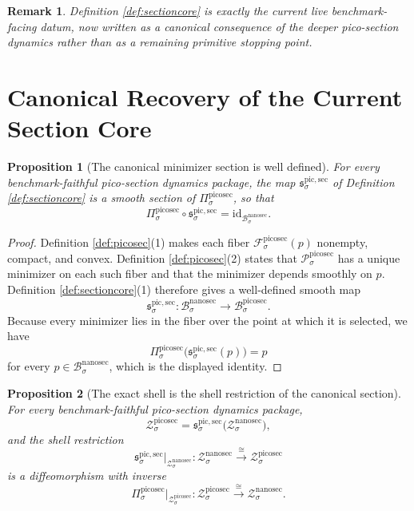 \documentclass[11pt]{article}
\newcommand{\NanoSectionBody}[1]{\mathcal B_{#1}^{\mathrm{nanosec}}}
\newcommand{\NanoSectionShell}[1]{\mathcal Z_{#1}^{\mathrm{nanosec}}}
\newcommand{\PicoSectionBody}[1]{\mathcal B_{#1}^{\mathrm{picosec}}}
\newcommand{\PicoSectionProj}[1]{\Pi_{#1}^{\mathrm{picosec}}}
\newcommand{\PicoSectionFiber}[2]{\mathcal F_{#1}^{\mathrm{picosec}}(#2)}
\newcommand{\PicoSectionFunctional}[1]{\mathscr P_{#1}^{\mathrm{picosec}}}
\newcommand{\PicoSectionShell}[1]{\mathcal Z_{#1}^{\mathrm{picosec}}}
\newcommand{\PicoMinSection}[1]{\mathfrak s_{#1}^{\mathrm{pic,sec}}}
\newtheorem{proposition}{Proposition}
\newtheorem{remark}{Remark}
\begin{document}
\begin{remark}
Definition \ref{def:sectioncore} is exactly the current live benchmark-facing datum, now written as a canonical consequence of the deeper pico-section dynamics rather than as a remaining primitive stopping point.
\end{remark}

\section{Canonical Recovery of the Current Section Core}

\begin{proposition}[The canonical minimizer section is well defined]
\label{prop:section}
For every benchmark-faithful pico-section dynamics package, the map \(\PicoMinSection{\sigma}\) of Definition \ref{def:sectioncore} is a smooth section of \(\PicoSectionProj{\sigma}\), so that
\[
\PicoSectionProj{\sigma}\circ\PicoMinSection{\sigma}
=
\mathrm{id}_{\NanoSectionBody{\sigma}}.
\]
\end{proposition}

\begin{proof}
Definition \ref{def:picosec}(1) makes each fiber \(\PicoSectionFiber{\sigma}{p}\) nonempty, compact, and convex. Definition \ref{def:picosec}(2) states that \(\PicoSectionFunctional{\sigma}\) has a unique minimizer on each such fiber and that the minimizer depends smoothly on \(p\). Definition \ref{def:sectioncore}(1) therefore gives a well-defined smooth map
\[
\PicoMinSection{\sigma}:\NanoSectionBody{\sigma}\to\PicoSectionBody{\sigma}.
\]
Because every minimizer lies in the fiber over the point at which it is selected, we have
\[
\PicoSectionProj{\sigma}\bigl(\PicoMinSection{\sigma}(p)\bigr)=p
\]
for every \(p\in\NanoSectionBody{\sigma}\), which is the displayed identity.
\end{proof}

\begin{proposition}[The exact shell is the shell restriction of the canonical section]
\label{prop:shell}
For every benchmark-faithful pico-section dynamics package,
\[
\PicoSectionShell{\sigma}
=
\PicoMinSection{\sigma}\bigl(\NanoSectionShell{\sigma}\bigr),
\]
and the shell restriction
\[
\PicoMinSection{\sigma}\big|_{\NanoSectionShell{\sigma}}
:
\NanoSectionShell{\sigma}\xrightarrow{\cong}\PicoSectionShell{\sigma}
\]
is a diffeomorphism with inverse
\[
\PicoSectionProj{\sigma}\big|_{\PicoSectionShell{\sigma}}
:
\PicoSectionShell{\sigma}\xrightarrow{\cong}\NanoSectionShell{\sigma}.
\]
\end{proposition}
\end{document}
